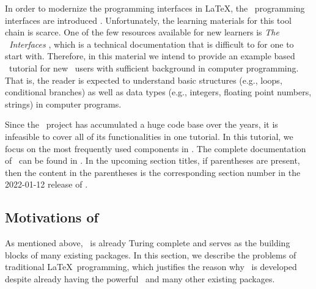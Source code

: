 \documentclass{ltugboat}
\begin{document}
In order to modernize the programming interfaces in \LaTeX, the \liii~programming interfaces are introduced \cite{mittelbach2020quo}.
Unfortunately, the learning materials for this tool chain is scarce.
One of the few resources available for new learners is \emph{The \liii\ Interfaces} \cite{l3interface}, which is a technical documentation that is difficult to for one to start with.
Therefore, in this material we intend to provide an example based \liii\ tutorial for new \liii\ users with sufficient background in computer programming.
That is, the reader is expected to understand basic structures (e.g., loops, conditional branches) as well as data types (e.g., integers, floating point numbers, strings) in computer programs. 



Since the \liii~project has accumulated a huge code base over the years, it is infeasible to cover all of its functionalities in one tutorial.
In this tutorial, we focus on the most frequently used components in \liii. 
The complete documentation of \liii\  can be found in \cite{l3interface}. 
In the upcoming section titles, if parentheses are present, then the content in the parentheses is the corresponding section number in the 2022-01-12 release of \cite{l3interface}.



\subsection{Motivations of \liii}

As mentioned above, \LaTeXe~is already Turing complete and serves as the building blocks of many existing packages. In this section, we describe the problems of traditional \LaTeX~programming, which justifies the reason why \liii~is developed despite already having the powerful \LaTeXe~and many other existing packages.
\end{document}
